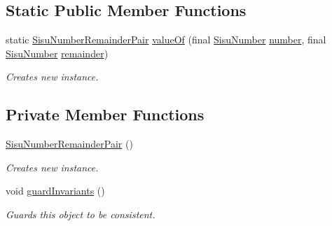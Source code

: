 \subsection*{Static Public Member Functions}
\begin{DoxyCompactItemize}
\item 
static \hyperlink{classcom_1_1aarrelaakso_1_1drawl_1_1_sisu_number_remainder_pair}{Sisu\+Number\+Remainder\+Pair} \hyperlink{classcom_1_1aarrelaakso_1_1drawl_1_1_sisu_number_remainder_pair_aa489b0cd18117d9c7d4994ec60af0984}{value\+Of} (final \hyperlink{classcom_1_1aarrelaakso_1_1drawl_1_1_sisu_number}{Sisu\+Number} \hyperlink{classcom_1_1aarrelaakso_1_1drawl_1_1_sisu_number_remainder_pair_a7ff7c95e41cb9dfbccb419fc75d05706}{number}, final \hyperlink{classcom_1_1aarrelaakso_1_1drawl_1_1_sisu_number}{Sisu\+Number} \hyperlink{classcom_1_1aarrelaakso_1_1drawl_1_1_sisu_number_remainder_pair_a2db9bc3ff60d0078b3341f75dd830890}{remainder})
\begin{DoxyCompactList}\small\item\em Creates new instance. \end{DoxyCompactList}\end{DoxyCompactItemize}
\subsection*{Private Member Functions}
\begin{DoxyCompactItemize}
\item 
\hyperlink{classcom_1_1aarrelaakso_1_1drawl_1_1_sisu_number_remainder_pair_adc48547d9eb6d9b59734cda97198e37c}{Sisu\+Number\+Remainder\+Pair} ()
\begin{DoxyCompactList}\small\item\em Creates new instance. \end{DoxyCompactList}\item 
void \hyperlink{classcom_1_1aarrelaakso_1_1drawl_1_1_sisu_number_remainder_pair_ac1a84d348f25642a02cae7df8903119c}{guard\+Invariants} ()
\begin{DoxyCompactList}\small\item\em Guards this object to be consistent. \end{DoxyCompactList}\end{DoxyCompactItemize}
